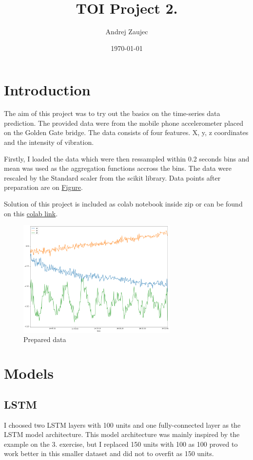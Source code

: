 \documentclass[11pt]{article}
\author{Andrej Zaujec}
\date{\today}
\title{TOI Project 2.}
\begin{document}
\maketitle
\tableofcontents


\section{Introduction}
\label{sec:org7f380fe}

The aim of this project was to try out the basics on the time-series data prediction.
The provided data were from the mobile phone accelerometer placed on the Golden Gate bridge. The data consists of four features. X, y, z coordinates and the intensity of vibration.

Firstly, I loaded the data which were then ressampled within 0.2 seconds bins and mean was used as the aggregation functions accross the bins. The data were rescaled by the Standard scaler from the scikit library.
Data points after preparation are on \hyperref[fig-data]{Figure}.

Solution of this project is included as colab notebook inside zip or can be found on this \href{https://colab.research.google.com/drive/1QnNlVVQAvBnOAw6MyzjF8tp6aVFfo1Ue?usp=sharing}{colab link}.
\begin{figure}[htbp]
\centering
\includegraphics[width=300px]{values_plot.png}
\caption{\label{fig-data}Prepared data}
\end{figure}

\section{Models}
\label{sec:orgcea4834}
\subsection{LSTM}
\label{sec:org4ad9d84}
I choosed two LSTM layers with 100 units and one fully-connected layer as the LSTM model architecture. This model architecture was mainly inspired by the example on the 3. exercise, but I replaced 150 units with 100 as 100 proved to work better in this smaller dataset and did not to overfit as 150 units.
\end{document}
